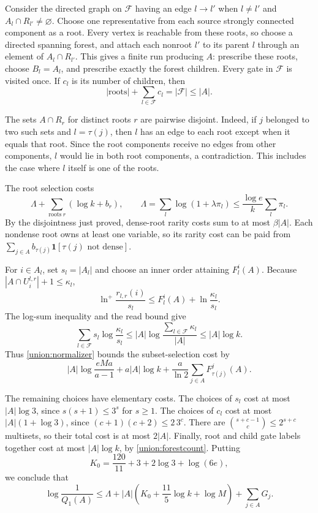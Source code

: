\documentclass[11pt]{amsart}
\theoremstyle{definition}
\theoremstyle{remark}
\begin{document}
Consider the directed graph on $\mathcal F$ having an edge $l\to l'$ when
$l\ne l'$ and $A_l\cap R_{l'}\ne\varnothing$.
Choose one representative from each source strongly connected component as a root.
Every vertex is reachable from these roots, so choose a directed spanning forest, and attach each nonroot $l'$ to its parent $l$ through an element of $A_l\cap R_{l'}$.
This gives a finite run producing $A$: prescribe these roots, choose $B_l=A_l$, and prescribe exactly the forest children.
Every gate in $\mathcal F$ is visited once.
If $c_l$ is its number of children, then
\begin{equation}\label{union:forestcount}
 |\mathrm{roots}|+\sum_{l\in\mathcal F}c_l=|\mathcal F|\le|A|.
\end{equation}

The sets $A\cap R_r$ for distinct roots $r$ are pairwise disjoint.
Indeed, if $j$ belonged to two such sets and $l=\tau(j)$, then $l$ has an edge to each root except when it equals that root.
Since the root components receive no edges from other components, $l$ would lie in both root components, a contradiction.
This includes the case where $l$ itself is one of the roots.

The root selection costs
\[
 \Lambda+\sum_{\mathrm{roots}\ r}(\log k+b_r),
 \qquad
 \Lambda=\sum_l\log(1+\lambda\pi_l)
 \le\frac{\log e}{k}\sum_l\pi_l.
\]
By the disjointness just proved, dense-root rarity costs sum to at most $\beta|A|$.
Each nondense root owns at least one variable, so its rarity cost can be paid from
$\sum_{j\in A}b_{\tau(j)}\mathbf1[\tau(j)\text{ not dense}]$.

For $i\in A_l$, set $s_l=|A_l|$ and choose an inner order attaining $F_l^i(A)$.
Because $|A\cap U_i^{l,r}|+1\le\kappa_l$,
\[
 \ln^+\frac{r_{l,r}(i)}{s_l}
 \le F_l^i(A)+\ln\frac{\kappa_l}{s_l}.
\]
The log-sum inequality and the read bound give
\begin{equation}\label{union:logsum}
 \sum_{l\in\mathcal F}s_l\log\frac{\kappa_l}{s_l}
 \le |A|\log\frac{\sum_{l\in\mathcal F}\kappa_l}{|A|}
 \le |A|\log k.
\end{equation}
Thus \eqref{union:normalizer} bounds the subset-selection cost by
\[
 |A|\log\frac{eMa}{a-1}
 +a|A|\log k+\frac a{\ln2}\sum_{j\in A}F_{\tau(j)}^j(A).
\]

The remaining choices have elementary costs.
The choices of $s_l$ cost at most $|A|\log3$, since $s(s+1)\le3^s$ for $s\ge1$.
The choices of $c_l$ cost at most $|A|(1+\log3)$, since $(c+1)(c+2)\le2\,3^c$.
There are $\binom{s+c-1}{c}\le2^{s+c}$ multisets, so their total cost is at most $2|A|$.
Finally, root and child gate labels together cost at most $|A|\log k$, by \eqref{union:forestcount}.
Putting
\begin{equation}\label{union:K0}
 K_0=\frac{120}{11}+3+2\log3+\log(6e),
\end{equation}
we conclude that
\begin{equation}\label{union:runbound}
 \log\frac1{Q_1(A)}
 \le \Lambda+|A|\left(K_0+\frac{11}{5}\log k+\log M\right)
               +\sum_{j\in A}G_j.
\end{equation}
\end{document}

